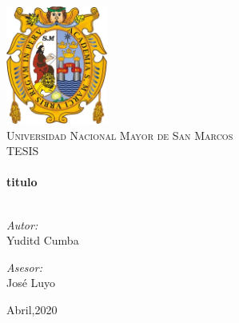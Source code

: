 \begin{titlepage}
\vbox{ }

\vbox{ }

\begin{center}
\includegraphics[width=0.25\textwidth]{img/logoUNMSM.jpg}\\[1cm]
\textsc{\LARGE Universidad Nacional Mayor de San Marcos}\\[1.5cm]
\textsc{\Large TESIS}\\[0.5cm]

\vbox{ }
\HRule \\[0.4cm]
{ \huge \bfseries titulo}\\[0.4cm]
\HRule \\[1.5cm]
\begin{minipage}{0.4\textwidth}
\begin{flushleft} \large
\emph{Autor: }\\
Yuditd Cumba
\end{flushleft}
\end{minipage}
\begin{minipage}{0.4\textwidth}
\begin{flushright} \large
\emph{Asesor:} \\
José Luyo
\end{flushright}
\end{minipage}
\vfill
{\large Abril,2020}
\end{center}
\end{titlepage}